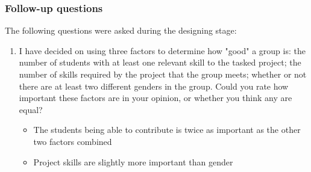 \documentclass{article}
\begin{document}
\subsubsection{Follow-up questions}
The following questions were asked during the designing stage:
\begin{enumerate}
    \item I have decided on using three factors to determine how "good" a group is: the number of students with at least one relevant skill to the tasked project; the number of skills required by the project that the group meets; whether or not there are at least two different genders in the group. Could you rate how important these factors are in your opinion, or whether you think any are equal? 
            \begin{itemize} \item The students being able to contribute is twice as important as the other two factors combined \item Project skills are slightly more important than gender\end{itemize}
\end{enumerate}
\end{document}
